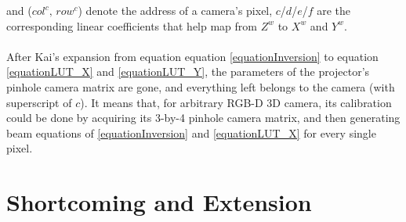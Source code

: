 %
and (\(col^c, \, row^c\)) denote the address of a camera's pixel, \(c\)/\(d\)/\(e\)/\(f\) are the corresponding linear coefficients that help map from \(Z^w\) to \(X^w\) and \(Y^w\).%
\\\\%
After Kai's expansion from equation equation \ref{equationInversion} to equation \ref{equationLUT_X} and \ref{equationLUT_Y}, the parameters of the projector's pinhole camera matrix are gone, and everything left belongs to the camera (with superscript of \(c\)). It means that, for arbitrary RGB-D 3D camera, its calibration could be done by acquiring its 3-by-4 pinhole camera matrix, and then generating beam equations of \ref{equationInversion} and \ref{equationLUT_X} for every single pixel.
%
\section{Shortcoming and Extension}

